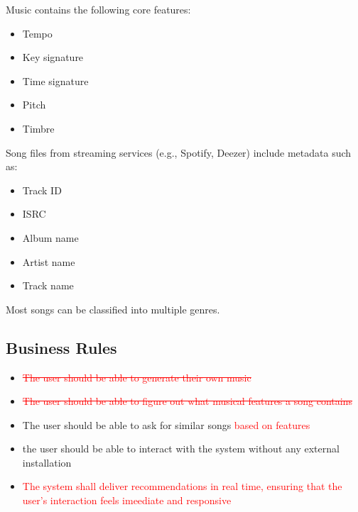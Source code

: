 \documentclass[12pt]{article}
\begin{document}
Music contains the following core features:
\begin{itemize}
    \item Tempo
    \item Key signature
    \item Time signature
    \item Pitch
    \item Timbre
\end{itemize}
\noindent Song files from streaming services (e.g., Spotify, Deezer) include metadata such as:
\begin{itemize}
    \item Track ID
    \item ISRC
    \item Album name
    \item Artist name
    \item Track name
\end{itemize}
\noindent Most songs can be classified into multiple genres.

\subsection{Business Rules}
\begin{itemize}
  \item \textcolor{red}{\sout{The user should be able to generate their own music}}
  \item \textcolor{red}{\sout{The user should be able to figure out what musical features a song contains }}
  \item The user should be able to ask for similar songs \textcolor{red}{based on features}
  \item the user should be able to interact with the system without any external installation
  \item \textcolor{red}{The system shall deliver recommendations in real time, ensuring that the user's interaction feels imeediate and responsive}
\end{itemize}
\end{document}
